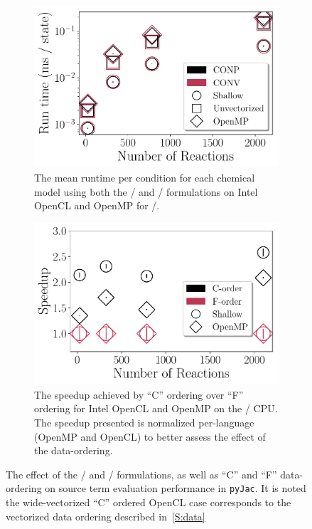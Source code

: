 \documentclass[12pt,number,sort&compress,preprint]{elsarticle}
\begin{document}
\begin{figure}[htb]
   \centering
  \begin{subfigure}[t]{0.45\linewidth}
      \includegraphics[width=\textwidth]{source_conpvsconv.pdf}
      \caption{The mean runtime per condition for each chemical model using both the \conp/ and \conv/ formulations on Intel OpenCL and OpenMP for \avx/.}
      \label{F:source_conpvsconv}
  \end{subfigure}
  \hfill
  \begin{subfigure}[t]{0.45\linewidth}
      \includegraphics[width=\textwidth]{source_cvsf.pdf}
      \caption{The speedup achieved by ``C'' ordering over ``F'' ordering for Intel OpenCL and OpenMP on the \avx/ CPU.  The speedup presented is normalized per-language (OpenMP and OpenCL) to better assess the effect of the data-ordering.}
      \label{F:source_cvsf}
  \end{subfigure}
  \caption{The effect of the \conp/ and \conv/ formulations, as well as ``C'' and ``F'' data-ordering on source term evaluation performance in \texttt{pyJac}.
	   It is noted the wide-vectorized ``C'' ordered OpenCL case corresponds to the vectorized data ordering described in~\cref{S:data}}
  \label{f:source_permutate}
\end{figure}
\end{document}
